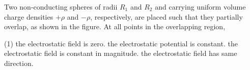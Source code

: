 
\item Two non-conducting spheres of radii \( R_1 \) and \( R_2 \) and carrying uniform volume charge densities \( +\rho \) and \( -\rho \), respectively, are placed such that they partially overlap, as shown in the figure. At all points in the overlapping region,
        \begin{center}
        \end{center}
        \begin{tasks}(1)
            \task the electrostatic field is zero.
            \task the electrostatic potential is constant.
            \task the electrostatic field is constant in magnitude.
            \task the electrostatic field has same direction.
        \end{tasks}
